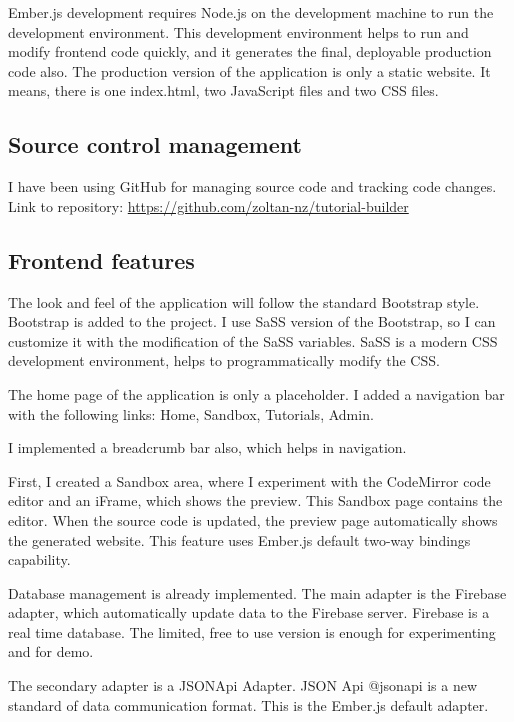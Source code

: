 Ember.js development requires Node.js on the development machine to run
the development environment. This development environment helps to run
and modify frontend code quickly, and it generates the final, deployable
production code also. The production version of the application is only
a static website. It means, there is one index.html, two JavaScript
files and two CSS files.

\subsection{Source control management}\label{source-control-management}

I have been using GitHub for managing source code and tracking code
changes. Link to repository:
\url{https://github.com/zoltan-nz/tutorial-builder}

\subsection{Frontend features}\label{frontend-features}

The look and feel of the application will follow the standard Bootstrap
style. Bootstrap is added to the project. I use SaSS version of the
Bootstrap, so I can customize it with the modification of the SaSS
variables. SaSS is a modern CSS development environment, helps to
programmatically modify the CSS.

The home page of the application is only a placeholder. I added a
navigation bar with the following links: Home, Sandbox, Tutorials,
Admin.

I implemented a breadcrumb bar also, which helps in navigation.

First, I created a Sandbox area, where I experiment with the CodeMirror
code editor and an iFrame, which shows the preview. This Sandbox page
contains the editor. When the source code is updated, the preview page
automatically shows the generated website. This feature uses Ember.js
default two-way bindings capability.

Database management is already implemented. The main adapter is the
Firebase adapter, which automatically update data to the Firebase
server. Firebase is a real time database. The limited, free to use
version is enough for experimenting and for demo.

The secondary adapter is a JSONApi Adapter. JSON Api @jsonapi is a new
standard of data communication format. This is the Ember.js default
adapter.

